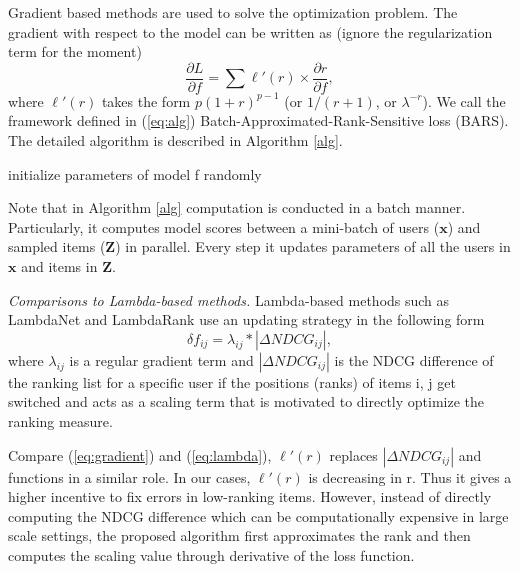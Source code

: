 \documentclass[letterpaper]{article}
\begin{document}
Gradient based methods are used to solve the optimization problem. The gradient with respect to the model can be written as (ignore the regularization term for the moment)
\begin{equation}
\label{eq:gradient}
\frac{\partial L}{\partial f} = \sum \ell'(r) \times \frac{\partial r}{\partial f},
\end{equation}
where $\ell'(r)$ takes the form $p(1+r)^{p-1}$ (or $1/(r+1)$, or $\lambda^{-r}$). We call the framework defined in (\ref{eq:alg}) Batch-Approximated-Rank-Sensitive loss (BARS). The detailed algorithm is described in Algorithm \ref{alg}.

\begin{algorithm}[!ht]
\SetAlgoLined
{}
 initialize parameters of model f randomly\;
 \caption{}
 \label{alg}
\end{algorithm}

Note that in Algorithm \ref{alg} computation is conducted in a batch manner. Particularly, it computes model scores between a mini-batch of users ($\textbf{x}$) and sampled items ($\textbf{Z}$) in parallel. Every step it updates parameters of all the users in $\textbf{x}$ and items in $\textbf{Z}$.

\textit{Comparisons to Lambda-based methods.} Lambda-based methods such as LambdaNet and LambdaRank use an updating strategy in the following form
\begin{equation}
\label{eq:lambda}
\delta f_{ij} = \lambda_{ij} * |\Delta NDCG_{ij}|,
\end{equation}
where $\lambda_{ij}$ is a regular gradient term and $|\Delta NDCG_{ij}|$ is the NDCG difference of the ranking list for a specific user if the positions (ranks) of items i, j get switched and acts as a  scaling term that is motivated to directly optimize the ranking measure.

Compare (\ref{eq:gradient}) and (\ref{eq:lambda}), $\ell'(r)$ replaces $|\Delta NDCG_{ij}|$ and functions in a similar role. In our cases, $\ell'(r)$ is decreasing in r. Thus it gives a higher incentive to fix errors in low-ranking items. However, instead of directly computing the NDCG difference which can be computationally expensive in large scale settings, the proposed algorithm first approximates the rank and then computes the scaling value through derivative of the loss function.
\end{document}
